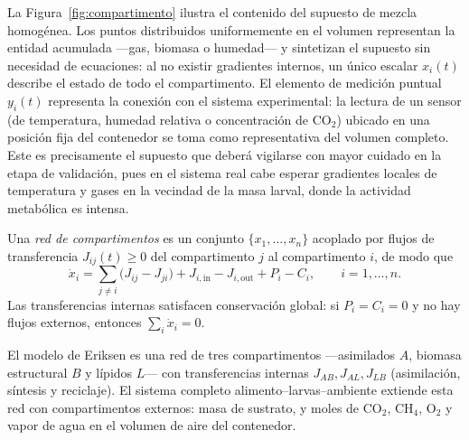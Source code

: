La Figura~\ref{fig:compartimento} ilustra el contenido del supuesto de mezcla
homogénea. Los puntos distribuidos uniformemente en el volumen representan la
entidad acumulada ---gas, biomasa o humedad--- y sintetizan el supuesto sin
necesidad de ecuaciones: al no existir gradientes internos, un único escalar
$x_i(t)$ describe el estado de todo el compartimento. El elemento de medición
puntual $y_i(t)$ representa la conexión con el sistema experimental: la
lectura de un sensor (de temperatura, humedad relativa o concentración de
CO$_2$) ubicado en una posición fija del contenedor se toma como
representativa del volumen completo. Este es precisamente el supuesto que
deberá vigilarse con mayor cuidado en la etapa de validación, pues en el
sistema real cabe esperar gradientes locales de temperatura y gases en la
vecindad de la masa larval, donde la actividad metabólica es intensa.

\begin{definition}\label{def14}
Una \emph{red de compartimentos} es un conjunto $\{x_1, \dots, x_n\}$ acoplado
por flujos de transferencia $J_{ij}(t) \geq 0$ del compartimento $j$ al
compartimento $i$, de modo que
\begin{equation}
\dot{x}_i = \sum_{j \neq i} \bigl( J_{ij} - J_{ji} \bigr)
+ J_{i,\mathrm{in}} - J_{i,\mathrm{out}} + P_i - C_i,
\qquad i = 1, \dots, n.
\label{eq:red}
\end{equation}
Las transferencias internas satisfacen conservación global: si $P_i = C_i = 0$
y no hay flujos externos, entonces $\sum_i \dot{x}_i = 0$.
\end{definition}

\begin{remark}
El modelo de Eriksen es una red de tres compartimentos ---asimilados $A$,
biomasa estructural $B$ y lípidos $L$--- con transferencias internas
$J_{AB}, J_{AL}, J_{LB}$ (asimilación, síntesis y reciclaje). El sistema
completo alimento--larvas--ambiente extiende esta red con compartimentos
externos: masa de sustrato, y moles de CO$_2$, CH$_4$, O$_2$ y vapor de agua
en el volumen de aire del contenedor.
\end{remark}

